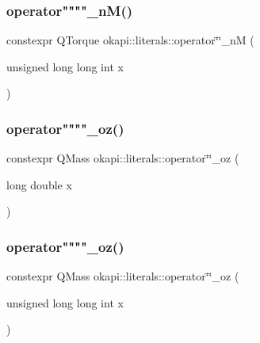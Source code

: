 \mbox{\label{namespaceokapi_1_1literals_a433bada2f177e78607acb15e2953668c}} 
\subsubsection{\texorpdfstring{operator""""\_nM()}{operator""\_nM()}\hspace{0.1cm}{\footnotesize\ttfamily [2/2]}}
{\footnotesize\ttfamily constexpr Q\+Torque okapi\+::literals\+::operator\char`\"{}\char`\"{}\+\_\+nM (\begin{DoxyParamCaption}\item[{unsigned long long int}]{x }\end{DoxyParamCaption})}

\mbox{\label{namespaceokapi_1_1literals_a8d9009d2400cba754b84e5e6ad9e8aa7}} 
\subsubsection{\texorpdfstring{operator""""\_oz()}{operator""\_oz()}\hspace{0.1cm}{\footnotesize\ttfamily [1/2]}}
{\footnotesize\ttfamily constexpr Q\+Mass okapi\+::literals\+::operator\char`\"{}\char`\"{}\+\_\+oz (\begin{DoxyParamCaption}\item[{long double}]{x }\end{DoxyParamCaption})}

\mbox{\label{namespaceokapi_1_1literals_a080ca78fe17f0bfe78e0a9c1c152aee9}} 
\subsubsection{\texorpdfstring{operator""""\_oz()}{operator""\_oz()}\hspace{0.1cm}{\footnotesize\ttfamily [2/2]}}
{\footnotesize\ttfamily constexpr Q\+Mass okapi\+::literals\+::operator\char`\"{}\char`\"{}\+\_\+oz (\begin{DoxyParamCaption}\item[{unsigned long long int}]{x }\end{DoxyParamCaption})}

